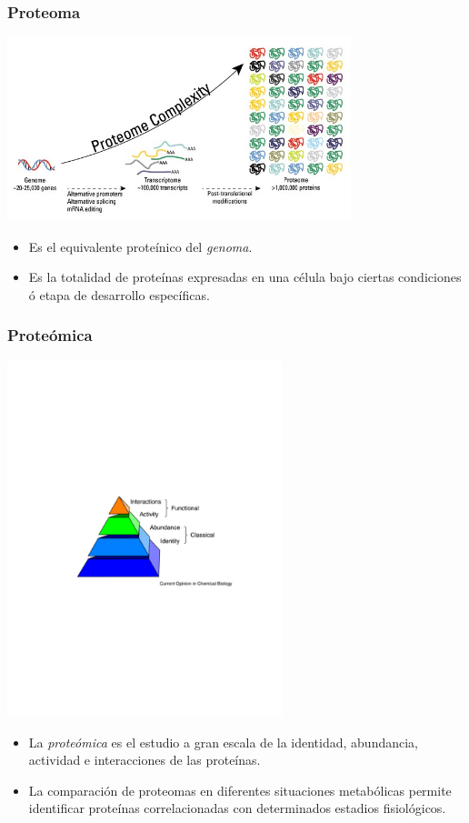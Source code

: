 \documentclass[10pt]{beamer}
\begin{document}
\begin{frame}
\frametitle{Proteoma}
\begin{center}
\includegraphics[width=10cm]{imagenes/Proteome}
\end{center}
\begin{itemize}
\item Es el equivalente proteínico del \emph{genoma}.
\pause
\item Es la totalidad de proteínas expresadas en una célula bajo ciertas condiciones ó etapa de desarrollo específicas.
\end{itemize}
\end{frame}
\begin{frame}
\frametitle{Proteómica}
\begin{center}
\includegraphics[width=8cm]{imagenes/Proteomics}
\end{center}
\begin{itemize}
\item La \emph{proteómica} es el estudio a gran escala de la identidad, abundancia, actividad e interacciones de las proteínas.
\pause
\item La comparación de proteomas en diferentes situaciones metabólicas permite identificar proteínas correlacionadas con determinados estadios fisiológicos.
\end{itemize}
\end{frame}
\end{document}
